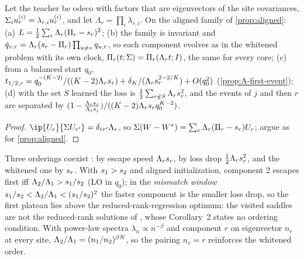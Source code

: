 \begin{proposition}\label{prop:A-aligned-cov}
  \proven{} 
  Let the teacher be odeco with factors that are eigenvectors of the site covariances,
  $\Sigma_{i}u_{r}^{(i)}=\lambda_{r,i}u_{r}^{(i)}$, and let $\Lambda_r=\prod_i\lambda_{r,i}$. On the aligned family of
  \cref{prop:aligned}: (a) $L=\frac12\sum_r\Lambda_r(\Pi_{r}-s_{r})^2$; (b) the family is invariant and
  $\dot q_{v,r}=\Lambda_r(s_{r}-\Pi_{r})\prod_{u\ne v}q_{u,r}$, so each component evolves as in the whitened
  problem with its own clock, $\Pi_{r}(t;\Sigma)=\Pi_{r}(\Lambda_rt;I)$, the same for every core; (c) from a
  balanced start $q_0$, $t_{1/2,r}=q_0^{-(K-2)}/((K-2)\Lambda_rs_{r})+\delta_K/(\Lambda_rs_{r}^{2-2/K})+O(q_0^2)$
  (\cref{prop:A-first-event}); (d) with the set $S$ learned the loss is $\frac12\sum_{r\notin S}\Lambda_rs_{r}^2$, and
  the events of $j$ and then $r$ are separated by
  $(1-\frac{\Lambda_rs_{r}}{\Lambda_js_{j}})/((K-2)\Lambda_rs_{r}q_0^{K-2})$.
\end{proposition}
\begin{proof}
  $\ip{\U r}{\Sig\U{r'}}=\delta_{rr'}\Lambda_r$, so $\Sigma(W-W^{*})=\sum_r\Lambda_r(\Pi_{r}-s_{r})U_{r}$; argue as for \cref{prop:aligned}.
\end{proof}
Three orderings coexist \derived{} \newresult: by escape speed $\Lambda_rs_{r}$, by loss drop $\frac12\Lambda_rs_{r}^2$, and
the whitened one by $s_{r}$. With $s_{1}>s_{2}$ and aligned initialization, component 2 escapes first iff
$\Lambda_2/\Lambda_1>s_{1}/s_{2}$ (LO in $q_0$); in the \emph{mismatch window} $s_{1}/s_{2}<\Lambda_2/\Lambda_1<(s_{1}/s_{2})^2$ the faster
component is the smaller loss drop, so the first plateau lies above the reduced-rank-regression optimum:
the visited saddles are not the reduced-rank solutions of \citet{gidel2019implicit}, whose Corollary~2
states no ordering condition. With power-law spectra $\lambda_n\propto n^{-\beta}$ and component $r$ on eigenvector
$n_r$ at every site, $\Lambda_2/\Lambda_1=(n_1/n_2)^{\beta N}$, so the pairing $n_r=r$ reinforces the whitened order.


